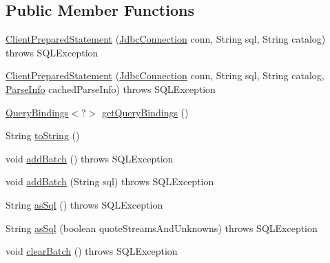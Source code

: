 \subsection*{Public Member Functions}
\begin{DoxyCompactItemize}
\item 
\mbox{\hyperlink{classcom_1_1mysql_1_1cj_1_1jdbc_1_1_client_prepared_statement_afb74bdcedd39ca4b9966cfa26abe4b8b}{Client\+Prepared\+Statement}} (\mbox{\hyperlink{interfacecom_1_1mysql_1_1cj_1_1jdbc_1_1_jdbc_connection}{Jdbc\+Connection}} conn, String sql, String catalog)  throws S\+Q\+L\+Exception 
\item 
\mbox{\hyperlink{classcom_1_1mysql_1_1cj_1_1jdbc_1_1_client_prepared_statement_aa5e87b6277bf7625290f892273da82c2}{Client\+Prepared\+Statement}} (\mbox{\hyperlink{interfacecom_1_1mysql_1_1cj_1_1jdbc_1_1_jdbc_connection}{Jdbc\+Connection}} conn, String sql, String catalog, \mbox{\hyperlink{classcom_1_1mysql_1_1cj_1_1_parse_info}{Parse\+Info}} cached\+Parse\+Info)  throws S\+Q\+L\+Exception 
\item 
\mbox{\hyperlink{interfacecom_1_1mysql_1_1cj_1_1_query_bindings}{Query\+Bindings}}$<$?$>$ \mbox{\hyperlink{classcom_1_1mysql_1_1cj_1_1jdbc_1_1_client_prepared_statement_aa7710948c9da0ab8fc0591a3b7054c4d}{get\+Query\+Bindings}} ()
\item 
String \mbox{\hyperlink{classcom_1_1mysql_1_1cj_1_1jdbc_1_1_client_prepared_statement_adbbbd2407424c34277a0699d7be261b4}{to\+String}} ()
\item 
void \mbox{\hyperlink{classcom_1_1mysql_1_1cj_1_1jdbc_1_1_client_prepared_statement_aad5a8e892856f06b5c1ea3bd43750213}{add\+Batch}} ()  throws S\+Q\+L\+Exception 
\item 
void \mbox{\hyperlink{classcom_1_1mysql_1_1cj_1_1jdbc_1_1_client_prepared_statement_a848bc9a8b6ea7b0149e2005c0ee48114}{add\+Batch}} (String sql)  throws S\+Q\+L\+Exception 
\item 
String \mbox{\hyperlink{classcom_1_1mysql_1_1cj_1_1jdbc_1_1_client_prepared_statement_a461d64dc00a3441272a3715ac343a121}{as\+Sql}} ()  throws S\+Q\+L\+Exception 
\item 
String \mbox{\hyperlink{classcom_1_1mysql_1_1cj_1_1jdbc_1_1_client_prepared_statement_a0e325f7e413b98f1b9cc92d5b6e212d1}{as\+Sql}} (boolean quote\+Streams\+And\+Unknowns)  throws S\+Q\+L\+Exception 
\item 
void \mbox{\hyperlink{classcom_1_1mysql_1_1cj_1_1jdbc_1_1_client_prepared_statement_ad99b56ea5ee5daf5c72806771382d21d}{clear\+Batch}} ()  throws S\+Q\+L\+Exception 

\end{DoxyCompactItemize}
